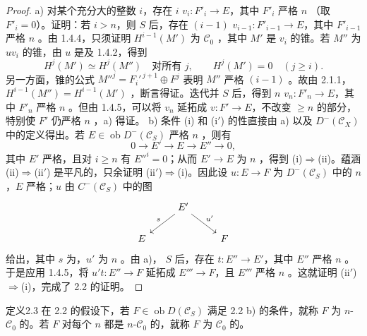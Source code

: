 \begin{proof}
a) 对某个充分大的整数 $i$，存在 $i$  $v_i:F'_i\to E$，其中 $F'_i$ 严格 $n$ （取 $F'_i=0$）。证明：若 $i>n$，则 $S$ 后，存在 $(i-1)$  $v_{i-1}:F'_{i-1}\to E$，其中 $F'_{i-1}$ 严格 $n$ 。由 1.4.4，只须证明 $H^{i-1}(M')$ 为 $\mathscr C_0$ ，其中 $M'$ 是 $v_i$ 的锥。若 $M''$ 为 $uv_i$ 的锥，由 $u$ 是及 1.4.2，得到
\[H^j(M')\simeq H^j(M'')\quad\text{对所有 }j,\qquad H^j(M')=0\quad(j\geq i).\]
另一方面，锥的公式 $M''^j=F_i'^{\,j+1}\oplus F^j$ 表明 $M''$ 严格 $(i-1)$ 。故由 2.1.1，$H^{i-1}(M'')=H^{i-1}(M')$ ，断言得证。迭代并 $S$ 后，得到 $n$  $v_n:F'_n\to E$，其中 $F'_n$ 严格 $n$ 。但由 1.4.5，可以将 $v_n$ 延拓成 $v:F'\to E$，不改变 $\geq n$ 的部分，特别使 $F'$ 仍严格 $n$ ，a) 得证。
b) 条件 (i) 和 (i$'$) 的性直接由 a) 以及 $D^-(\mathscr C_X)$ 中的定义得出。若 $E\in\operatorname{ob}D^-(\mathscr C_S)$ 严格 $n$ ，则有
\[0\longrightarrow E'\longrightarrow E\longrightarrow E''\longrightarrow0,\]
其中 $E'$ 严格，且对 $i\geq n$ 有 $E''^i=0$；从而 $E'\to E$ 为 $n$ ，得到 (i)$\Rightarrow$(ii)。蕴涵 (ii)$\Rightarrow$(ii$'$) 是平凡的，只余证明 (ii$'$)$\Rightarrow$(i)。因此设 $u:E\to F$ 为 $D^-(\mathscr C_S)$ 中的 $n$ ，$E$ 严格；$u$ 由 $C^-(\mathscr C_S)$ 中的图
\[\begin{tikzcd}&E'\arrow[dl,"s"']\arrow[dr,"u'"]&\\E&&F\end{tikzcd}\]
给出，其中 $s$ 为，$u'$ 为 $n$ 。由 a)， $S$ 后，存在 $t:E''\to E'$，其中 $E''$ 严格 $n$ 。于是应用 1.4.5，将 $u't:E''\to F$ 延拓成 $E'''\to F$，且 $E'''$ 严格 $n$ 。这就证明 (ii$'$)$\Rightarrow$(i)，完成了 2.2 的证明。
\end{proof}
\begin{SGAresult}{定义}{2.3}
在 2.2 的假设下，若 $F\in\operatorname{ob}D(\mathscr C_S)$ 满足 2.2 b) 的条件，就称 $F$ 为 $n$-$\mathscr C_0$ 的。若 $F$ 对每个 $n$ 都是 $n$-$\mathscr C_0$ 的，就称 $F$ 为 $\mathscr C_0$ 的。
\end{SGAresult}
